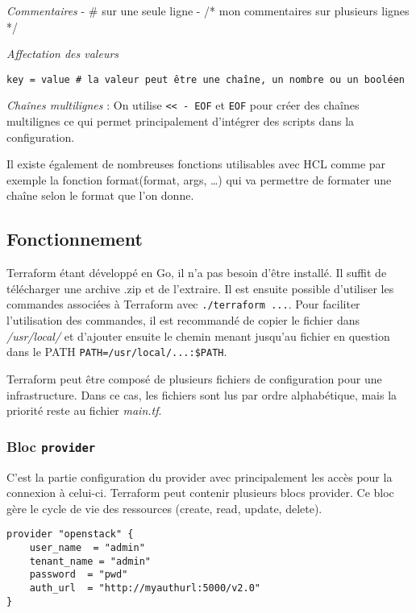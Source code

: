 \documentclass[]{article}
\begin{document}
\emph{Commentaires} - \# sur une seule ligne - /* mon commentaires sur
plusieurs lignes */

\emph{Affectation des valeurs}

\begin{verbatim}
key = value # la valeur peut être une chaîne, un nombre ou un booléen
\end{verbatim}

\emph{Chaînes multilignes} : On utilise
\texttt{\textless{}\textless{}\ -\ EOF} et \texttt{EOF} pour créer des
chaînes multilignes ce qui permet principalement d'intégrer des scripts
dans la configuration.

Il existe également de nombreuses fonctions utilisables avec HCL comme
par exemple la fonction format(format, args, \ldots{}) qui va permettre
de formater une chaîne selon le format que l'on donne.

\subsection{Fonctionnement}\label{fonctionnement}

Terraform étant développé en Go, il n'a pas besoin d'être installé. Il
suffit de télécharger une archive .zip et de l'extraire. Il est ensuite
possible d'utiliser les commandes associées à Terraform avec
\texttt{./terraform\ ...}. Pour faciliter l'utilisation des commandes,
il est recommandé de copier le fichier dans \emph{/usr/local/} et
d'ajouter ensuite le chemin menant jusqu'au fichier en question dans le
PATH \texttt{PATH=/usr/local/...:\$PATH}.

Terraform peut être composé de plusieurs fichiers de configuration pour
une infrastructure. Dans ce cas, les fichiers sont lus par ordre
alphabétique, mais la priorité reste au fichier \emph{main.tf}.

\subsubsection{\texorpdfstring{Bloc
\textbf{\texttt{provider}}}{Bloc provider}}\label{bloc-provider}

C'est la partie configuration du provider avec principalement les accès
pour la connexion à celui-ci. Terraform peut contenir plusieurs blocs
provider. Ce bloc gère le cycle de vie des ressources (create, read,
update, delete).

\begin{verbatim}
provider "openstack" {
    user_name  = "admin"
    tenant_name = "admin"
    password  = "pwd"
    auth_url  = "http://myauthurl:5000/v2.0"
}
\end{verbatim}
\end{document}
